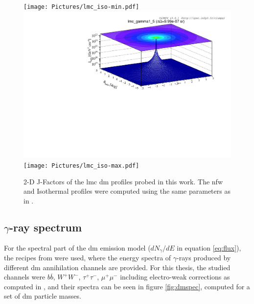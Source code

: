 \documentclass[main.tex]{subfiles}
\begin{document}
\begin{figure}
\endminipage
{}
\texttt{[image: Pictures/lmc\_iso-min.pdf]}
\endminipage \\
\includegraphics[width=1\textwidth]{Pictures/lmc_gamma1-5.pdf}
\endminipage
{}
\texttt{[image: Pictures/lmc\_iso-max.pdf]}
\endminipage
  \caption{2-D J-Factors of the \gls{lmc} \gls{dm} profiles probed in this work. The \gls{nfw} and Isothermal profiles were computed using the same parameters as in \cite{2015FermiLMCDM}.}
    \label{fig:jfactors}
\end{figure}

\subsection{$\gamma$-ray spectrum}

For the spectral part of the \gls{dm} emission model ($dN_{\gamma}/dE$ in equation \ref{eq:flux}), the recipes from \cite{2011cirelli} were used, where the energy spectra of $\gamma$-rays produced by different \gls{dm} annihilation channels are provided. For this thesis, the studied channels were $b \overline b$, $W^+ W^-$, $\tau^+\tau^-$, $\mu^+ \mu^-$ including electro-weak corrections as computed in \cite{2011EWcorrections}, and their spectra can be seen in figure \ref{fig:dmspec}, computed for a set of \gls{dm} particle masses.
\end{document}
